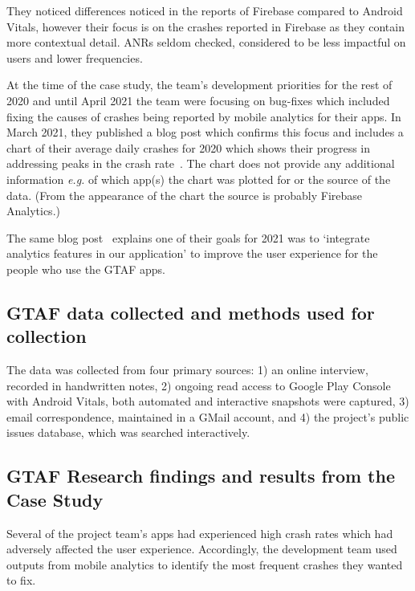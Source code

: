 They noticed differences noticed in the reports of Firebase compared to Android Vitals, however their focus is on the crashes reported in Firebase as they contain more contextual detail. ANRs seldom checked, considered to be less impactful on users and lower frequencies. %

At the time of the case study, the team's development priorities for the rest of 2020 and until April 2021 the team were focusing on bug-fixes which included fixing the causes of crashes being reported by mobile analytics for their apps. In March 2021, they published a blog post which confirms this focus and includes a chart of their average daily crashes for 2020 which shows their progress in addressing peaks in the crash rate~\citep{gtafblog2021_gtaf_accomplishment_2020}. The chart does not provide any additional information \emph{e.g.} of which app(s) the chart was plotted for or the source of the data. (From the appearance of the chart the source is probably Firebase Analytics.)

The same blog post~\citep{gtafblog2021_gtaf_accomplishment_2020} explains one of their goals for 2021 was to `integrate analytics features in our application' to improve the user experience for the people who use the GTAF apps.

\subsection{GTAF data collected and methods used for collection}
The data was collected from four primary sources: 1) an online interview, recorded in handwritten notes, 2) ongoing read access to Google Play Console with Android Vitals, both automated and interactive snapshots were captured, 3) email correspondence, maintained in a GMail account, and 4) the project's public issues database, which was searched interactively. 

\subsection{GTAF Research findings and results from the Case Study}
Several of the project team's apps had experienced high crash rates which had adversely affected the user experience. Accordingly, the development team used outputs from mobile analytics to identify the most frequent crashes they wanted to fix.

